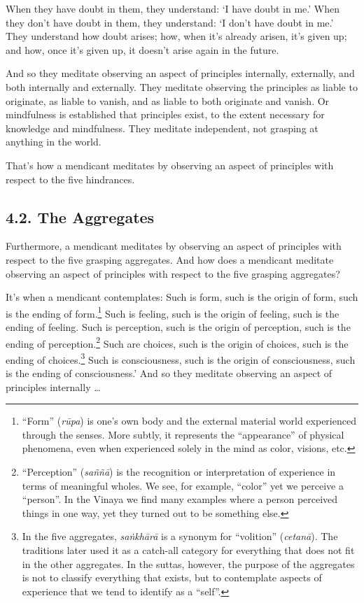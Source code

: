 \documentclass[12pt,openany]{book}%
\begin{document}
When they have doubt in them, they understand: ‘I have doubt in me.’ When they don’t have doubt in them, they understand: ‘I don’t have doubt in me.’ They understand how doubt arises; how, when it’s already arisen, it’s given up; and how, once it’s given up, it doesn’t arise again in the future. 

And so they meditate observing an aspect of principles internally, externally, and both internally and externally. They meditate observing the principles as liable to originate, as liable to vanish, and as liable to both originate and vanish. Or mindfulness is established that principles exist, to the extent necessary for knowledge and mindfulness. They meditate independent, not grasping at anything in the world. 

That’s how a mendicant meditates by observing an aspect of principles with respect to the five hindrances. 

\subsection*{4.2. The Aggregates }

Furthermore, a mendicant meditates by observing an aspect of principles with respect to the five grasping aggregates. And how does a mendicant meditate observing an aspect of principles with respect to the five grasping aggregates? 

It’s when a mendicant contemplates: Such is form, such is the origin of form, such is the ending of form.\footnote{“Form” (\textit{\textsanskrit{rūpa}}) is one’s own body and the external material world experienced through the senses. More subtly, it represents the “appearance” of physical phenomena, even when experienced solely in the mind as color, visions, etc. } Such is feeling, such is the origin of feeling, such is the ending of feeling. Such is perception, such is the origin of perception, such is the ending of perception.\footnote{“Perception” (\textit{\textsanskrit{saññā}}) is the recognition or interpretation of experience in terms of meaningful wholes. We see, for example, “color” yet we perceive a “person”. In the Vinaya we find many examples where a person perceived things in one way, yet they turned out to be something else. } Such are choices, such is the origin of choices, such is the ending of choices.\footnote{In the five aggregates, \textit{\textsanskrit{saṅkhārā}} is a synonym for “volition” (\textit{\textsanskrit{cetanā}}). The traditions later used it as a catch-all category for everything that does not fit in the other aggregates. In the suttas, however, the purpose of the aggregates is not to classify everything that exists, but to contemplate aspects of experience that we tend to identify as a “self”. } Such is consciousness, such is the origin of consciousness, such is the ending of consciousness.’ And so they meditate observing an aspect of principles internally … 
\end{document}
